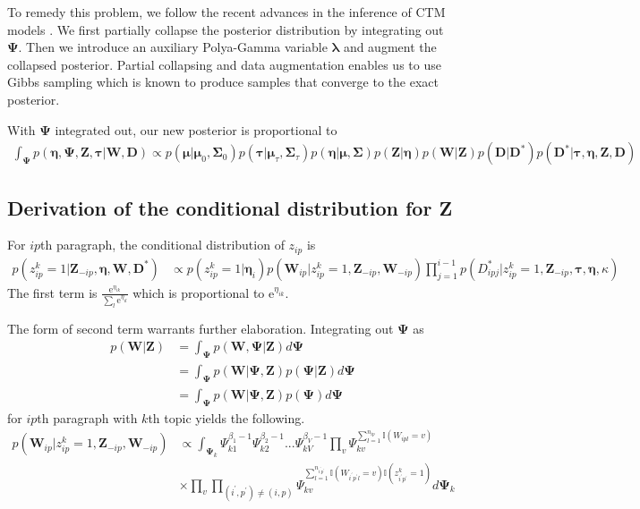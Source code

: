 To remedy this problem, we follow the recent advances in the inference of CTM models \citep{held2006bayesian,chen2013scalable,linderman2015dependent}. We first partially collapse the posterior distribution by integrating out $\pmb\Psi$. Then we introduce an auxiliary Polya-Gamma variable $\pmb\lambda$ and augment the collapsed posterior. Partial collapsing and data augmentation enables us to use Gibbs sampling which is known to produce samples that converge to the exact posterior. 

With $\pmb\Psi$ integrated out, our new posterior is proportional to
{\small
\begin{align}
	\int_{\pmb\Psi}p(\pmb\eta,\pmb\Psi,\textbf{Z},\pmb\tau|\textbf{W},\textbf{D}) \propto p(\pmb\mu|\pmb\mu_0,\pmb\Sigma_0)p(\pmb\tau|\pmb\mu_{\tau},\pmb\Sigma_{\tau})p(\pmb\eta|\pmb\mu,\pmb\Sigma)p(\textbf{Z}|\pmb\eta)p(\textbf{W}|\textbf{Z})p(\textbf{D}|\textbf{D}^*)p(\textbf{D}^*|\pmb\tau,\pmb\eta,\textbf{Z},\textbf{D})
\end{align}
}
\subsection{Derivation of the conditional distribution for \textbf{Z}}
For $ip$th paragraph, the conditional distribution of $z_{ip}$ is
{\small
\begin{align}   
    p(z_{ip}^k=1|\mathbf{Z}_{-ip},\pmb\eta,\mathbf{W},\mathbf{D}^*) &\propto p(z_{ip}^k=1|\pmb\eta_i)p(\mathbf{W}_{ip}|z_{ip}^k=1,\mathbf{Z}_{-ip},\mathbf{W}_{-ip}) \prod_{j=1}^{i-1}p(D_{ipj}^*|z_{ip}^k=1,\textbf{Z}_{-ip},\pmb\tau,\pmb\eta,\kappa)
\end{align}
}
The first term is $\frac{\text{e}^{\eta_{ik}}}{\sum_{l}\text{e}^{\eta_{il}}}$ which is proportional to $\text{e}^{\eta_{ik}}$.

The form of second term warrants further elaboration. Integrating out $\pmb\Psi$ as
\begin{align}
	p(\textbf{W}|\textbf{Z}) &= \int_{\pmb\Psi} p(\textbf{W},\pmb\Psi|\textbf{Z})d\pmb\Psi \nonumber \\
	&= \int_{\pmb\Psi} p(\textbf{W}|\pmb\Psi,\textbf{Z})p(\pmb\Psi|\textbf{Z})d\pmb\Psi \nonumber \\
	&= \int_{\pmb\Psi} p(\textbf{W}|\pmb\Psi,\textbf{Z})p(\pmb\Psi)d\pmb\Psi
\end{align}
for $ip$th paragraph with $k$th topic yields the following.
\begin{align}
    p(\mathbf{W}_{ip}|z_{ip}^k=1,\mathbf{Z}_{-ip},\mathbf{W}_{-ip}) &\propto \int_{\pmb{\Psi}_k}\Psi_{k1}^{\beta_1-1}\Psi_{k2}^{\beta_2-1} ... \Psi_{kV}^{\beta_V-1} \prod_v \Psi_{kv}^{\sum_{l=1}^{n_{ip}} \mathbb{I}(W_{ipl}=v)} \nonumber \\
    & \times \prod_v \prod_{(i^{'},p^{'}) \neq (i,p)} \Psi_{kv}^{\sum_{l=1}^{n_{i^{'}p^{'}}} \mathbb{I}(W_{i^{'}p^{'}l}=v)\mathbb{I}(z_{i^{'}p^{'}}^k=1)} d\pmb{\Psi}_k
\end{align}

